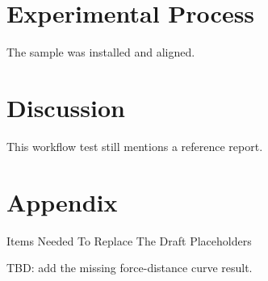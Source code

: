 \section{Experimental Process}
The sample was installed and aligned.

\section{Discussion}
This workflow test still mentions a reference report.

\section{Appendix}
Items Needed To Replace The Draft Placeholders

TBD: add the missing force-distance curve result.
